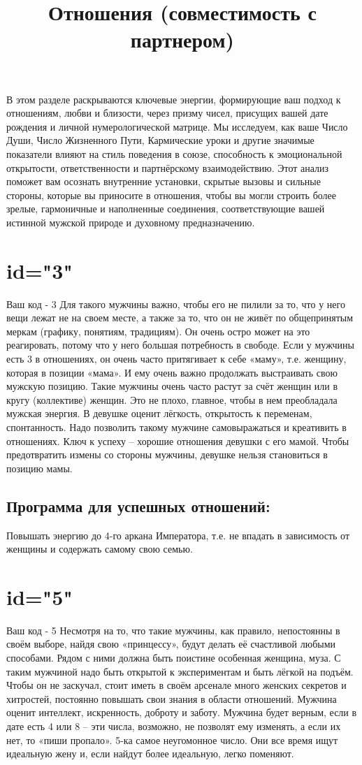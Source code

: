 \title{Отношения (совместимость с партнером)}
\description
В этом разделе раскрываются ключевые энергии, формирующие ваш подход 
к отношениям, любви и близости, через призму чисел, присущих вашей 
дате рождения и личной нумерологической матрице. Мы исследуем, как 
ваше Число Души, Число Жизненного Пути, Кармические уроки и другие 
значимые показатели влияют на стиль поведения в союзе, способность 
к эмоциональной открытости, ответственности и партнёрскому 
взаимодействию. Этот анализ поможет вам осознать внутренние 
установки, скрытые вызовы и сильные стороны, которые вы приносите 
в отношения, чтобы вы могли строить более зрелые, гармоничные и 
наполненные соединения, соответствующие вашей истинной мужской 
природе и духовному предназначению.
\enddescription

\section{id="3"}{Ваш код - 3}
Для такого мужчины важно, чтобы его не пилили за то, что у него вещи 
лежат не на своем месте, а также за то, что он не живёт по 
общепринятым меркам (графику, понятиям, традициям). Он очень остро 
может на это реагировать, потому что у него большая потребность в 
свободе. Если у мужчины есть 3 в отношениях, он очень часто притягивает 
к себе «маму», т.е. женщину, которая в позиции «мама». И ему очень 
важно продолжать выстраивать свою мужскую позицию. Такие мужчины 
очень часто растут за счёт женщин или в кругу (коллективе) женщин. 
Это не плохо, главное, чтобы в нем преобладала мужская энергия.
В девушке оценит лёгкость, открытость к переменам, спонтанность. 
Надо позволить такому мужчине самовыражаться и креативить в 
отношениях. Ключ к успеху – хорошие отношения девушки с его мамой.
Чтобы предотвратить измены со стороны мужчины, девушке нельзя 
становиться в позицию мамы.
\subsection{Программа для успешных отношений:}
\item Повышать энергию до 4-го аркана Императора, т.е. не впадать 
в зависимость от женщины и содержать самому свою семью.
\endsubsection
\endsection

\section{id="5"}{Ваш код - 5}
Несмотря на то, что такие мужчины, как правило, непостоянны в своём 
выборе, найдя свою «принцессу», будут делать её счастливой любыми 
способами. Рядом с ними должна быть поистине особенная женщина, муза. 
С таким мужчиной надо быть открытой к экспериментам и быть лёгкой 
на подъём. Чтобы он не заскучал, стоит иметь в своём арсенале много 
женских секретов и хитростей, постоянно повышать свои знания в 
области отношений. Мужчина оценит интеллект, искренность, доброту 
и заботу. Мужчина будет верным, если в дате есть 4 или 8 – эти числа, 
возможно, не позволят ему изменять, а если их нет, то «пиши пропало». 
5-ка самое неугомонное число. Они все время ищут идеальную жену и, 
если найдут более идеальную, легко поменяют.
